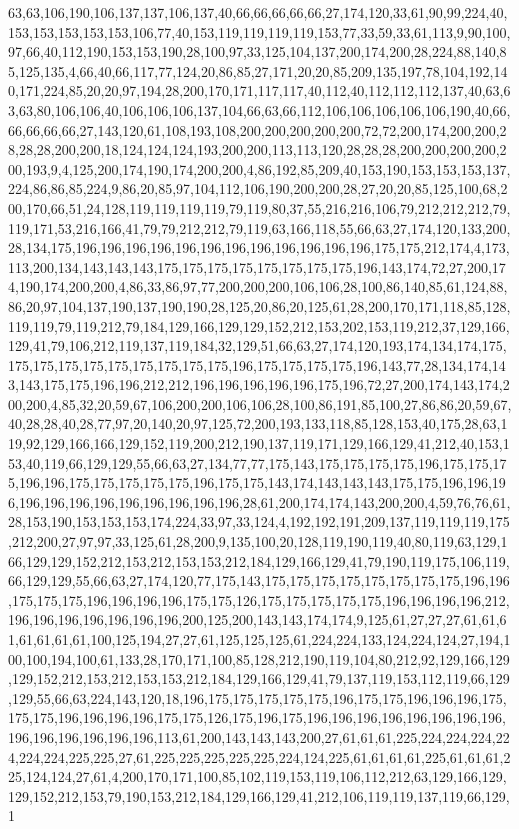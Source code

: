 63,63,106,190,106,137,137,106,137,40,66,66,66,66,66,27,174,120,33,61,90,99,224,40,153,153,153,153,153,106,77,40,153,119,119,119,119,153,77,33,59,33,61,113,9,90,100,97,66,40,112,190,153,153,190,28,100,97,33,125,104,137,200,174,200,28,224,88,140,85,125,135,4,66,40,66,117,77,124,20,86,85,27,171,20,20,85,209,135,197,78,104,192,140,171,224,85,20,20,97,194,28,200,170,171,117,117,40,112,40,112,112,112,137,40,63,63,63,80,106,106,40,106,106,106,137,104,66,63,66,112,106,106,106,106,106,190,40,66,66,66,66,66,27,143,120,61,108,193,108,200,200,200,200,200,72,72,200,174,200,200,28,28,28,200,200,18,124,124,124,193,200,200,113,113,120,28,28,28,200,200,200,200,200,193,9,4,125,200,174,190,174,200,200,4,86,192,85,209,40,153,190,153,153,153,137,224,86,86,85,224,9,86,20,85,97,104,112,106,190,200,200,28,27,20,20,85,125,100,68,200,170,66,51,24,128,119,119,119,119,79,119,80,37,55,216,216,106,79,212,212,212,79,119,171,53,216,166,41,79,79,212,212,79,119,63,166,118,55,66,63,27,174,120,133,200,28,134,175,196,196,196,196,196,196,196,196,196,196,196,196,175,175,212,174,4,173,113,200,134,143,143,143,175,175,175,175,175,175,175,175,196,143,174,72,27,200,174,190,174,200,200,4,86,33,86,97,77,200,200,200,106,106,28,100,86,140,85,61,124,88,86,20,97,104,137,190,137,190,190,28,125,20,86,20,125,61,28,200,170,171,118,85,128,119,119,79,119,212,79,184,129,166,129,129,152,212,153,202,153,119,212,37,129,166,129,41,79,106,212,119,137,119,184,32,129,51,66,63,27,174,120,193,174,134,174,175,175,175,175,175,175,175,175,175,175,196,175,175,175,175,196,143,77,28,134,174,143,143,175,175,196,196,212,212,196,196,196,196,196,175,196,72,27,200,174,143,174,200,200,4,85,32,20,59,67,106,200,200,106,106,28,100,86,191,85,100,27,86,86,20,59,67,40,28,28,40,28,77,97,20,140,20,97,125,72,200,193,133,118,85,128,153,40,175,28,63,119,92,129,166,166,129,152,119,200,212,190,137,119,171,129,166,129,41,212,40,153,153,40,119,66,129,129,55,66,63,27,134,77,77,175,143,175,175,175,175,196,175,175,175,196,196,175,175,175,175,175,196,175,175,143,174,143,143,143,175,175,196,196,196,196,196,196,196,196,196,196,196,196,28,61,200,174,174,143,200,200,4,59,76,76,61,28,153,190,153,153,153,174,224,33,97,33,124,4,192,192,191,209,137,119,119,119,175,212,200,27,97,97,33,125,61,28,200,9,135,100,20,128,119,190,119,40,80,119,63,129,166,129,129,152,212,153,212,153,153,212,184,129,166,129,41,79,190,119,175,106,119,66,129,129,55,66,63,27,174,120,77,175,143,175,175,175,175,175,175,175,175,196,196,175,175,175,196,196,196,196,175,175,126,175,175,175,175,175,196,196,196,196,212,196,196,196,196,196,196,196,200,125,200,143,143,174,174,9,125,61,27,27,27,61,61,61,61,61,61,61,100,125,194,27,27,61,125,125,125,61,224,224,133,124,224,124,27,194,100,100,194,100,61,133,28,170,171,100,85,128,212,190,119,104,80,212,92,129,166,129,129,152,212,153,212,153,153,212,184,129,166,129,41,79,137,119,153,112,119,66,129,129,55,66,63,224,143,120,18,196,175,175,175,175,175,196,175,175,196,196,196,175,175,175,196,196,196,196,175,175,126,175,196,175,196,196,196,196,196,196,196,196,196,196,196,196,196,196,113,61,200,143,143,143,200,27,61,61,61,225,224,224,224,224,224,224,225,225,27,61,225,225,225,225,225,224,124,225,61,61,61,61,225,61,61,61,225,124,124,27,61,4,200,170,171,100,85,102,119,153,119,106,112,212,63,129,166,129,129,152,212,153,79,190,153,212,184,129,166,129,41,212,106,119,119,137,119,66,129,1